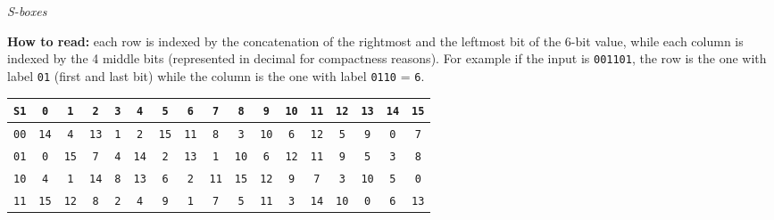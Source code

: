 \documentclass{article}
\begin{document}
  \vspace{20pt}

  \begin{center}
	\emph{S-boxes}
  \end{center}
	\textbf{How to read:} each row is indexed by the concatenation of the rightmost 
	and the leftmost bit of the 6-bit value, while each column is
	indexed by the 4 middle bits (represented in decimal for
	compactness reasons). For example if the input is \texttt{001101},
	the row is the one with label \texttt{01} (first and last bit) while 
	the column is the one with label \texttt{0110} = \texttt{6}.

  \begin{center}

\begin{tabular}{|c|cccccccccccccccc|}
  \hline
\texttt{S1} & \texttt{0} & \texttt{1} & \texttt{2} & \texttt{3} & \texttt{4} & \texttt{5} & \texttt{6} & \texttt{7} & \texttt{8} & \texttt{9} & \texttt{10} & \texttt{11} & \texttt{12} & \texttt{13} & \texttt{14} & \texttt{15} \\
\hline
\texttt{00} & \texttt{14} & \texttt{4} & \texttt{13} & \texttt{1} & \texttt{2} & \texttt{15} & \texttt{11} & \texttt{8} & \texttt{3} & \texttt{10} & \texttt{6} & \texttt{12} & \texttt{5} & \texttt{9} & \texttt{0} & \texttt{7} \\
\texttt{01} & \texttt{0} & \texttt{15} & \texttt{7} & \texttt{4} & \texttt{14} & \texttt{2} & \texttt{13} & \texttt{1} & \texttt{10} & \texttt{6} & \texttt{12} & \texttt{11} & \texttt{9} & \texttt{5} & \texttt{3} & \texttt{8} \\
\texttt{10} & \texttt{4} & \texttt{1} & \texttt{14} & \texttt{8} & \texttt{13} & \texttt{6} & \texttt{2} & \texttt{11} & \texttt{15} & \texttt{12} & \texttt{9} & \texttt{7} & \texttt{3} & \texttt{10} & \texttt{5} & \texttt{0} \\
\texttt{11} & \texttt{15} & \texttt{12} & \texttt{8} & \texttt{2} & \texttt{4} & \texttt{9} & \texttt{1} & \texttt{7} & \texttt{5} & \texttt{11} & \texttt{3} & \texttt{14} & \texttt{10} & \texttt{0} & \texttt{6} & \texttt{13} \\
  \hline
\end{tabular}


\end{center}
\end{document}
